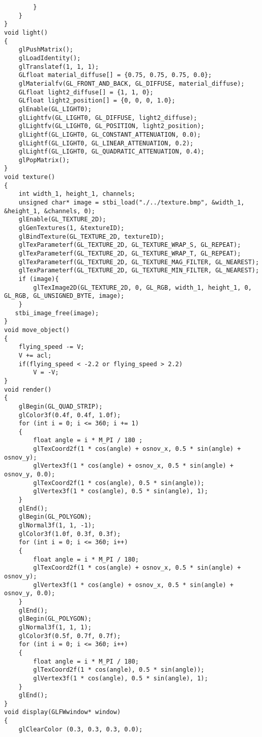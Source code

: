 \documentclass[a4paper, 14pt]{extarticle}
\begin{document}
\begin{verbatim}
        }
    }
}
void light()
{
    glPushMatrix();
    glLoadIdentity();
    glTranslatef(1, 1, 1);
    GLfloat material_diffuse[] = {0.75, 0.75, 0.75, 0.0};
    glMaterialfv(GL_FRONT_AND_BACK, GL_DIFFUSE, material_diffuse);
    GLfloat light2_diffuse[] = {1, 1, 0};
    GLfloat light2_position[] = {0, 0, 0, 1.0};
    glEnable(GL_LIGHT0);
    glLightfv(GL_LIGHT0, GL_DIFFUSE, light2_diffuse);
    glLightfv(GL_LIGHT0, GL_POSITION, light2_position);
    glLightf(GL_LIGHT0, GL_CONSTANT_ATTENUATION, 0.0);
    glLightf(GL_LIGHT0, GL_LINEAR_ATTENUATION, 0.2);
    glLightf(GL_LIGHT0, GL_QUADRATIC_ATTENUATION, 0.4);
    glPopMatrix();
}
void texture()
{
    int width_1, height_1, channels;
    unsigned char* image = stbi_load("./../texture.bmp", &width_1, &height_1, &channels, 0);
    glEnable(GL_TEXTURE_2D);
    glGenTextures(1, &textureID);
    glBindTexture(GL_TEXTURE_2D, textureID);
    glTexParameterf(GL_TEXTURE_2D, GL_TEXTURE_WRAP_S, GL_REPEAT);
    glTexParameterf(GL_TEXTURE_2D, GL_TEXTURE_WRAP_T, GL_REPEAT);
    glTexParameterf(GL_TEXTURE_2D, GL_TEXTURE_MAG_FILTER, GL_NEAREST);
    glTexParameterf(GL_TEXTURE_2D, GL_TEXTURE_MIN_FILTER, GL_NEAREST);
    if (image){
        glTexImage2D(GL_TEXTURE_2D, 0, GL_RGB, width_1, height_1, 0, GL_RGB, GL_UNSIGNED_BYTE, image);
    }
   stbi_image_free(image);
}
void move_object()
{
    flying_speed -= V;
    V += acl;
    if(flying_speed < -2.2 or flying_speed > 2.2)
        V = -V;
}
void render()
{
    glBegin(GL_QUAD_STRIP);
    glColor3f(0.4f, 0.4f, 1.0f);
    for (int i = 0; i <= 360; i += 1)
    {
        float angle = i * M_PI / 180 ;
        glTexCoord2f(1 * cos(angle) + osnov_x, 0.5 * sin(angle) + osnov_y);
        glVertex3f(1 * cos(angle) + osnov_x, 0.5 * sin(angle) + osnov_y, 0.0);
        glTexCoord2f(1 * cos(angle), 0.5 * sin(angle));
        glVertex3f(1 * cos(angle), 0.5 * sin(angle), 1);
    }
    glEnd();
    glBegin(GL_POLYGON);
    glNormal3f(1, 1, -1);
    glColor3f(1.0f, 0.3f, 0.3f);
    for (int i = 0; i <= 360; i++)
    {
        float angle = i * M_PI / 180;
        glTexCoord2f(1 * cos(angle) + osnov_x, 0.5 * sin(angle) + osnov_y);
        glVertex3f(1 * cos(angle) + osnov_x, 0.5 * sin(angle) + osnov_y, 0.0);
    }
    glEnd();
    glBegin(GL_POLYGON);
    glNormal3f(1, 1, 1);
    glColor3f(0.5f, 0.7f, 0.7f);
    for (int i = 0; i <= 360; i++)
    {
        float angle = i * M_PI / 180;
        glTexCoord2f(1 * cos(angle), 0.5 * sin(angle));
        glVertex3f(1 * cos(angle), 0.5 * sin(angle), 1);
    }
    glEnd();
}
void display(GLFWwindow* window)
{
    glClearColor (0.3, 0.3, 0.3, 0.0);

\end{verbatim}
\end{document}
